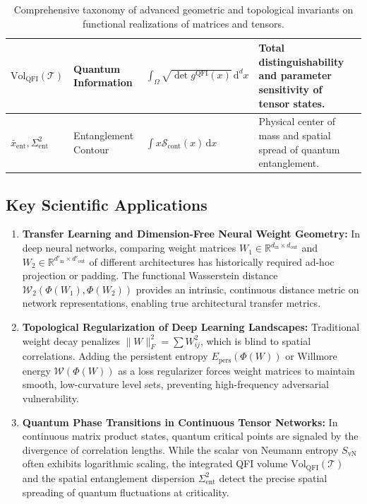 \documentclass[11pt,a4paper,reqno]{amsart}
\theoremstyle{definition}
\numberwithin{equation}{section}
\newcommand{\R}{\mathbb{R}}
\newcommand{\dif}{\,\mathrm{d}}
\begin{document}
\begin{table}[h!]
\begin{tabularx}{\textwidth}{@{} l p{2.8cm} p{3.2cm} X @{}}
\midrule
$\mathrm{Vol}_{\mathrm{QFI}}(\mathcal{T})$ & Quantum Information & $\int_\Omega \sqrt{\det g^{\mathrm{QFI}}(x)} \dif^d x$ & Total distinguishability and parameter sensitivity of tensor states. \\
\midrule
$\bar{x}_{\mathrm{ent}}, \Sigma_{\mathrm{ent}}^2$ & Entanglement Contour & $\int x \mathcal{S}_{\mathrm{cont}}(x) \dif x$ & Physical center of mass and spatial spread of quantum entanglement. \\
\bottomrule
\end{tabularx}
\caption{Comprehensive taxonomy of advanced geometric and topological invariants on functional realizations of matrices and tensors.}
\label{tab:master_taxonomy}
\end{table}

\subsection{Key Scientific Applications}
\begin{enumerate}[label=(\alph*),leftmargin=*]
    \item \textbf{Transfer Learning and Dimension-Free Neural Weight Geometry:} In deep neural networks, comparing weight matrices $W_1 \in \R^{d_{\mathrm{in}} \times d_{\mathrm{out}}}$ and $W_2 \in \R^{d'_{\mathrm{in}} \times d'_{\mathrm{out}}}$ of different architectures has historically required ad-hoc projection or padding. The functional Wasserstein distance $\mathcal{W}_2(\Phi(W_1), \Phi(W_2))$ provides an intrinsic, continuous distance metric on network representations, enabling true architectural transfer metrics.
    \item \textbf{Topological Regularization of Deep Learning Landscapes:} Traditional weight decay penalizes $\|W\|_F^2 = \sum W_{ij}^2$, which is blind to spatial correlations. Adding the persistent entropy $E_{\mathrm{pers}}(\Phi(W))$ or Willmore energy $\mathcal{W}(\Phi(W))$ as a loss regularizer forces weight matrices to maintain smooth, low-curvature level sets, preventing high-frequency adversarial vulnerability.
    \item \textbf{Quantum Phase Transitions in Continuous Tensor Networks:} In continuous matrix product states, quantum critical points are signaled by the divergence of correlation lengths. While the scalar von Neumann entropy $S_{\mathrm{vN}}$ often exhibits logarithmic scaling, the integrated QFI volume $\mathrm{Vol}_{\mathrm{QFI}}(\mathcal{T})$ and the spatial entanglement dispersion $\Sigma_{\mathrm{ent}}^2$ detect the precise spatial spreading of quantum fluctuations at criticality.
\end{enumerate}
\end{document}
